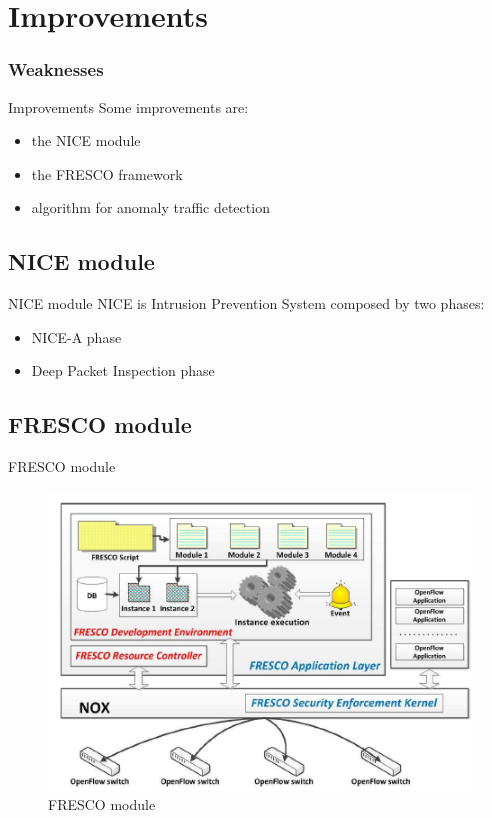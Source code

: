 \section{Improvements}
\frame
{
\frametitle{Weaknesses}
\tableofcontents[currentsection]
\addtocounter{framenumber}{-1}
}

\begin{frame}{Improvements}
Some improvements are:
\begin{itemize}
\item<2-> the NICE module
\item<3-> the FRESCO framework
\item<4-> algorithm for anomaly traffic detection
\end{itemize}
\end{frame}

\subsection{NICE module}
\begin{frame}{NICE module}
NICE is Intrusion Prevention System composed by two phases:
\begin{itemize}
\item<2-> NICE-A phase
\item<3-> Deep Packet Inspection phase
\end{itemize}
\end{frame}

\subsection{FRESCO module}
\begin{frame}{FRESCO module}
\begin{figure}
\includegraphics[scale=0.55]{Immagini/FrescoStructure.png}
\caption{FRESCO module}
\label{fig:FRESCO-module}
\end{figure}
\end{frame}

